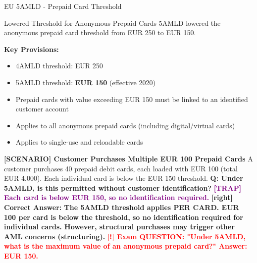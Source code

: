 \documentclass[11pt,a4paper]{beamer}
\newcommand{\redflag}[1]{\textcolor{red}{\textbf{[!] #1}}}
\newcommand{\trap}[1]{\textcolor{purple}{\textbf{[TRAP] #1}}}
\newcommand{\correct}[1]{\textcolor{green!50!black}{\textbf{[right] #1}}}
\newcommand{\scenario}[1]{\textcolor{blue!70!black}{\textbf{[SCENARIO] #1}}}
\begin{document}
\begin{frame}{EU 5AMLD - Prepaid Card Threshold}
\begin{block}{Lowered Threshold for Anonymous Prepaid Cards}
5AMLD lowered the anonymous prepaid card threshold from EUR 250 to EUR 150.
\end{block}
\textbf{Key Provisions:}
\begin{itemize}
\item 4AMLD threshold: EUR 250
\item 5AMLD threshold: \textbf{EUR 150} (effective 2020)
\item Prepaid cards with value exceeding EUR 150 must be linked to an identified customer account
\item Applies to all anonymous prepaid cards (including digital/virtual cards)
\item Applies to single-use and reloadable cards
\end{itemize}
\scenario{Customer Purchases Multiple EUR 100 Prepaid Cards}
A customer purchases 40 prepaid debit cards, each loaded with EUR 100 (total EUR 4,000). Each individual card is below the EUR 150 threshold.
\vspace{0.2cm}
\textbf{Q: Under 5AMLD, is this permitted without customer identification?}
\trap{Each card is below EUR 150, so no identification required.}
\correct{Correct Answer: The 5AMLD threshold applies PER CARD. EUR 100 per card is below the threshold, so no identification required for individual cards. However, structural purchases may trigger other AML concerns (structuring).}
\redflag{Exam QUESTION: "Under 5AMLD, what is the maximum value of an anonymous prepaid card?" Answer: EUR 150.}
\end{frame}

\end{document}
